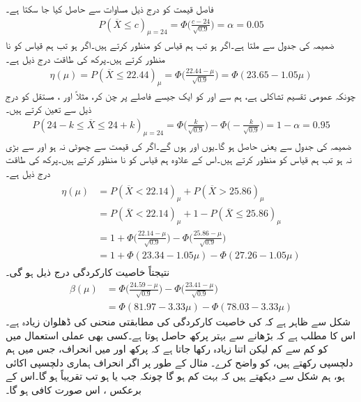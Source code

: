 \quad
فاصل قیمت  کو درج ذیل مساوات سے حاصل کیا جا سکتا ہے۔
\begin{align*}
P(\overline{X}\le c)_{\mu=24}=\Phi\big(\frac{c-24}{\sqrt{0.9}}\big)=\alpha=0.05
\end{align*}
ضمیمہ  کی جدول   سے  ملتا ہے۔اگر  ہو تب ہم قیاس کو منظور کرتے ہیں۔اگر  ہو تب ہم قیاس کو نا منظور کرتے ہیں۔پرکھ کی طاقت درج ذیل ہے۔
\begin{align}
\eta(\mu)=P(\overline{X}\le 22.44)_{\mu}=\Phi\big(\frac{22.44-\mu}{\sqrt{0.9}}\big)=\Phi(23.65-1.05\mu)
\end{align}
\quad
چونکہ عمومی تقسیم تشاکلی ہے، ہم  سے  اور  کو ایک جیسے فاصلے پر چن کر، مثلاً  اور ، مستقل  کو درج ذیل سے تعین کرتے ہیں۔
\begin{align*}
P(24-k\le \overline{X}\le 24+k)_{\mu=24}=\Phi\big(\frac{k}{\sqrt{0.9}}\big)-\Phi\big(-\frac{k}{\sqrt{0.9}}\big)=1-\alpha=0.95
\end{align*}
ضمیمہ  کی جدول  سے  یعنی  حاصل ہو گا۔یوں  اور  ہوں گے۔اگر  کی قیمت  سے چھوٹی نہ ہو اور  سے بڑی نہ ہو تب ہم قیاس کو منظور کرتے ہیں۔اس کے علاوہ ہم قیاس کو نا منظور کرتے ہیں۔پرکھ کی طاقت درج ذیل ہے۔
\begin{gather}
\begin{aligned}
\eta(\mu)&=P(\overline{X}<22.14)_{\mu}+P(\overline{X}>25.86)_{\mu}\\
&=P(\overline{X}<22.14)_{\mu}+1-P(\overline{X}\le 25.86)_{\mu}\\
&=1+\Phi\big(\frac{22.14-\mu}{\sqrt{0.9}}\big)-\Phi\big(\frac{25.86-\mu}{\sqrt{0.9}}\big)\\
&=1+\Phi(23.34-1.05\mu)-\Phi(27.26-1.05\mu)
\end{aligned}
\end{gather}
نتیجتاً خاصیت کارکردگی  درج ذیل ہو گی۔
\begin{align*}
\beta(\mu)&=\Phi\big(\frac{24.59-\mu}{\sqrt{0.9}}\big)-\Phi\big(\frac{23.41-\mu}{\sqrt{0.9}}\big)\\
&=\Phi(81.97-3.33\mu)-\Phi(78.03-3.33\mu)
\end{align*}
شکل سے ظاہر ہے کہ  کی خاصیت کارکردگی کی مطابقتی منحنی کی ڈھلوان زیادہ ہے۔اس کا مطلب ہے کہ  بڑھانے سے بہتر پرکھ حاصل ہوتا ہے۔کسی بھی عملی استعمال میں  کو کم سے کم لیکن اتنا زیادہ رکھا جاتا ہے کہ پرکھ  اور  میں انحراف، جس میں ہم دلچسپی رکھتے ہیں، کو  واضح  کرے۔ مثال کے طور پر اگر انحراف ہماری دلچسپی   اکائی ہو، ہم شکل سے دیکھتے ہیں کہ  بہت کم ہو گا چونکہ جب  یا  ہو تب  تقریباً  ہو گا۔اس کے برعکس ،  اس صورت کافی ہو گا۔

